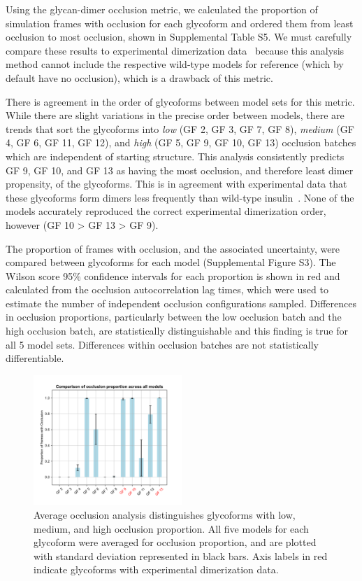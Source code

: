 \documentclass[9pt]{elife}
\begin{document}
Using the glycan-dimer occlusion metric, we calculated the proportion of simulation frames with occlusion for each glycoform and ordered them from least occlusion to most occlusion, shown in Supplemental Table S5. We must carefully compare these results to experimental dimerization data~\cite{guan2018chemically} because this analysis method cannot include the respective wild-type models for reference (which by default have no occlusion), which is a drawback of this metric.

There is agreement in the order of glycoforms between model sets for this metric. While there are slight variations in the precise order between models, there are trends that sort the glycoforms into \emph{low} (GF 2, GF 3, GF 7, GF 8), \emph{medium} (GF 4, GF 6, GF 11, GF 12), and \emph{high} (GF 5, GF 9, GF 10, GF 13) occlusion batches which are independent of starting structure. This analysis consistently predicts GF 9, GF 10, and GF 13 as having the most occlusion, and therefore least dimer propensity, of the glycoforms. This is in agreement with experimental data that these glycoforms form dimers less frequently than wild-type insulin~\cite{guan2018chemically}. None of the models accurately reproduced the correct experimental dimerization order, however (GF 10 > GF 13 > GF 9).

The proportion of frames with occlusion, and the associated uncertainty, were compared between glycoforms for each model (Supplemental Figure S3). The Wilson score 95\% confidence intervals for each proportion is shown in red and calculated from the occlusion autocorrelation lag times, which were used to estimate the number of independent occlusion configurations sampled. Differences in occlusion proportions, particularly between the low occlusion batch and the high occlusion batch, are statistically distinguishable and this finding is true for all 5 model sets. Differences within occlusion batches are not statistically differentiable.

\begin{figure}[H]
\centering
\includegraphics[width=0.50\textwidth]{Figures/occlusion_proportion_averaged.png}
\caption{Average occlusion analysis distinguishes glycoforms with low, medium, and high occlusion proportion. All five models for each glycoform were averaged for occlusion proportion, and are plotted with standard deviation represented in black bars. Axis labels in red indicate glycoforms with experimental dimerization data.}
\label{occlusion_results}
\end{figure}
\end{document}
